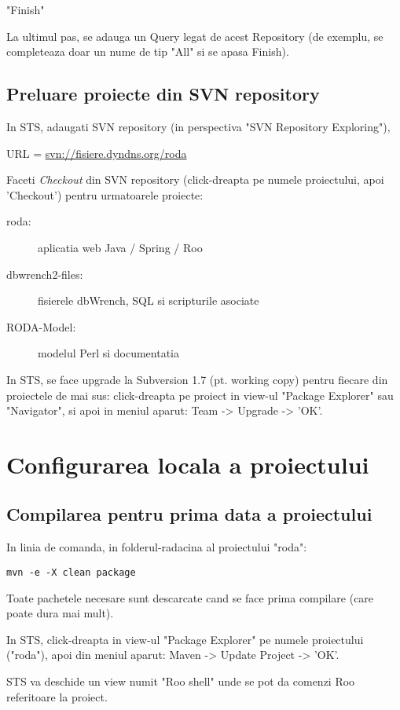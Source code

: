 "Finish"

La ultimul pas, se adauga un Query legat de acest Repository (de exemplu, se completeaza doar un nume de tip "All" si se apasa Finish).

\subsection{Preluare proiecte din SVN repository}
In STS, adaugati SVN repository (in perspectiva "SVN Repository
Exploring"), 

URL = \url{svn://fisiere.dyndns.org/roda}

Faceti \emph{Checkout} din SVN repository (click-dreapta pe numele
proiectului, apoi 'Checkout') pentru urmatoarele proiecte:
\begin{description}
\item [roda:] aplicatia web Java / Spring / Roo
\item [dbwrench2-files:] fisierele dbWrench, SQL si scripturile asociate
\item [RODA-Model:] modelul Perl si documentatia
\end{description}

In STS, se face upgrade la Subversion 1.7 (pt. working copy) pentru fiecare din proiectele de mai sus: 
click-dreapta pe proiect in view-ul "Package Explorer" sau "Navigator", si apoi in meniul aparut:
Team -> Upgrade -> 'OK'.

\section{Configurarea locala a proiectului}

\subsection{Compilarea pentru prima data a proiectului}

In linia de comanda, in folderul-radacina al proiectului "roda":
\begin{lstlisting}
mvn -e -X clean package
\end{lstlisting}

Toate pachetele necesare sunt descarcate cand se face prima compilare (care poate dura mai mult).

In STS, click-dreapta in view-ul "Package Explorer" pe numele proiectului ("roda"),
apoi din meniul aparut:
Maven -> Update Project -> 'OK'.

STS va deschide un view numit "Roo shell" unde se pot da comenzi Roo referitoare
la proiect.

